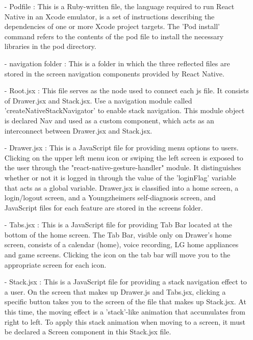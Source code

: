 \documentclass[conference]{IEEEtran}
\begin{document}
\begin{enumerate}
        \item[-] Podfile : This is a Ruby-written file, the language required to run React Native in an Xcode emulator, is a set of instructions describing the dependencies of one or more Xcode project targets. The 'Pod install' command refers to the contents of the pod file to install the necessary libraries in the pod directory. \\ 
        \item[-] navigation folder : This is a folder in which the three reflected files are stored in the screen navigation components provided by React Native.\\
        \item[-] Root.jsx : This file serves as the node used to connect each js file. It consists of Drawer.jsx and Stack.jsx. Use a navigation module called 'createNativeStackNavigator' to enable stack navigation. This module object is declared Nav and used as a custom component, which acts as an interconnect between Drawer.jsx and Stack.jsx. \\
        \item[-] Drawer.jsx : This is a JavaScript file for providing menu options to users. Clicking on the upper left menu icon or swiping the left screen is exposed to the user through the "react-native-gesture-handler" module. It distinguishes whether or not it is logged in through the value of the 'loginFlag' variable that acts as a global variable. Drawer.jsx is classified into a home screen, a login/logout screen, and a Youngzheimers self-diagnosis screen, and JavaScript files for each feature are stored in the screens folder. \\
        \item[-] Tabs.jsx : This is a JavaScript file for providing Tab Bar located at the bottom of the home screen. The Tab Bar, visible only on Drawer's home screen, consists of a calendar (home), voice recording, LG home appliances and game screens. Clicking the icon on the tab bar will move you to the appropriate screen for each icon. \\
        \item[-] Stack.jsx : This is a JavaScript file for providing a stack navigation effect to a user. On the screen that makes up Drawer.js and Tabs.jsx, clicking a specific button takes you to the screen of the file that makes up Stack.jsx. At this time, the moving effect is a 'stack'-like animation that accumulates from right to left. To apply this stack animation when moving to a screen, it must be declared a Screen component in this Stack.jsx file. \\

\end{enumerate}
\end{document}
